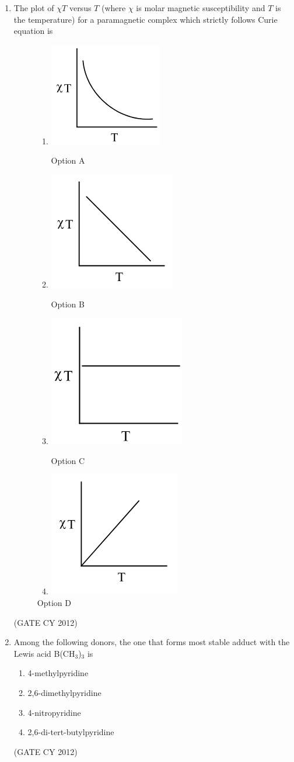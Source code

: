 \documentclass[12pt]{article}
\begin{document}
\begin{enumerate}
\item The plot of $\chi T$ versus $T$ (where $\chi$ is molar magnetic susceptibility and $T$ is the temperature) for a paramagnetic complex which strictly follows Curie equation is
\begin{figure}[H]
\begin{enumerate}
    \item \includegraphics[width=0.2\columnwidth]{figs/q20a.png}
    \caption{Option A}
    \label{fig:q20a}
    \item \includegraphics[width=0.2\columnwidth]{figs/q20b.png}
    \caption{Option B}
    \label{fig:q20b}
    \item \includegraphics[width=0.2\columnwidth]{figs/q20c.png}
    \caption{Option C}
    \label{fig:q20c}
    \item \includegraphics[width=0.2\columnwidth]{figs/q20d.png}
    \caption{Option D}
    \label{fig:q20d}
\end{enumerate}
\end{figure}
\hfill (GATE CY 2012)

\item Among the following donors, the one that forms most stable adduct with the Lewis acid B(CH$_3$)$_3$ is
\begin{multicols}{2}
\begin{enumerate}
    \item 4-methylpyridine
    \item 2,6-dimethylpyridine
    \item 4-nitropyridine
    \item 2,6-di-tert-butylpyridine
\end{enumerate}
\end{multicols}
\hfill (GATE CY 2012)


\end{enumerate}
\end{document}
